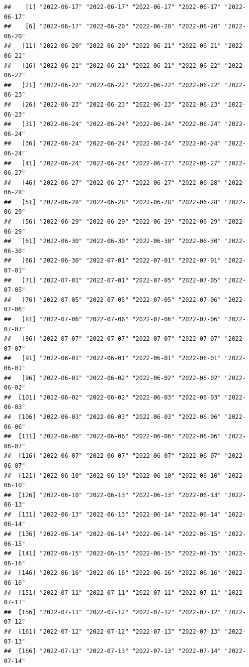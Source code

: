 \documentclass[
]{article}
\begin{document}
\begin{verbatim}
##    [1] "2022-06-17" "2022-06-17" "2022-06-17" "2022-06-17" "2022-06-17"
##    [6] "2022-06-17" "2022-06-20" "2022-06-20" "2022-06-20" "2022-06-20"
##   [11] "2022-06-20" "2022-06-20" "2022-06-21" "2022-06-21" "2022-06-21"
##   [16] "2022-06-21" "2022-06-21" "2022-06-21" "2022-06-22" "2022-06-22"
##   [21] "2022-06-22" "2022-06-22" "2022-06-22" "2022-06-22" "2022-06-23"
##   [26] "2022-06-23" "2022-06-23" "2022-06-23" "2022-06-23" "2022-06-23"
##   [31] "2022-06-24" "2022-06-24" "2022-06-24" "2022-06-24" "2022-06-24"
##   [36] "2022-06-24" "2022-06-24" "2022-06-24" "2022-06-24" "2022-06-24"
##   [41] "2022-06-24" "2022-06-24" "2022-06-27" "2022-06-27" "2022-06-27"
##   [46] "2022-06-27" "2022-06-27" "2022-06-27" "2022-06-28" "2022-06-28"
##   [51] "2022-06-28" "2022-06-28" "2022-06-28" "2022-06-28" "2022-06-29"
##   [56] "2022-06-29" "2022-06-29" "2022-06-29" "2022-06-29" "2022-06-29"
##   [61] "2022-06-30" "2022-06-30" "2022-06-30" "2022-06-30" "2022-06-30"
##   [66] "2022-06-30" "2022-07-01" "2022-07-01" "2022-07-01" "2022-07-01"
##   [71] "2022-07-01" "2022-07-01" "2022-07-05" "2022-07-05" "2022-07-05"
##   [76] "2022-07-05" "2022-07-05" "2022-07-05" "2022-07-06" "2022-07-06"
##   [81] "2022-07-06" "2022-07-06" "2022-07-06" "2022-07-06" "2022-07-07"
##   [86] "2022-07-07" "2022-07-07" "2022-07-07" "2022-07-07" "2022-07-07"
##   [91] "2022-06-01" "2022-06-01" "2022-06-01" "2022-06-01" "2022-06-01"
##   [96] "2022-06-01" "2022-06-02" "2022-06-02" "2022-06-02" "2022-06-02"
##  [101] "2022-06-02" "2022-06-02" "2022-06-03" "2022-06-03" "2022-06-03"
##  [106] "2022-06-03" "2022-06-03" "2022-06-03" "2022-06-06" "2022-06-06"
##  [111] "2022-06-06" "2022-06-06" "2022-06-06" "2022-06-06" "2022-06-07"
##  [116] "2022-06-07" "2022-06-07" "2022-06-07" "2022-06-07" "2022-06-07"
##  [121] "2022-06-10" "2022-06-10" "2022-06-10" "2022-06-10" "2022-06-10"
##  [126] "2022-06-10" "2022-06-13" "2022-06-13" "2022-06-13" "2022-06-13"
##  [131] "2022-06-13" "2022-06-13" "2022-06-14" "2022-06-14" "2022-06-14"
##  [136] "2022-06-14" "2022-06-14" "2022-06-14" "2022-06-15" "2022-06-15"
##  [141] "2022-06-15" "2022-06-15" "2022-06-15" "2022-06-15" "2022-06-16"
##  [146] "2022-06-16" "2022-06-16" "2022-06-16" "2022-06-16" "2022-06-16"
##  [151] "2022-07-11" "2022-07-11" "2022-07-11" "2022-07-11" "2022-07-11"
##  [156] "2022-07-11" "2022-07-12" "2022-07-12" "2022-07-12" "2022-07-12"
##  [161] "2022-07-12" "2022-07-12" "2022-07-13" "2022-07-13" "2022-07-13"
##  [166] "2022-07-13" "2022-07-13" "2022-07-13" "2022-07-14" "2022-07-14"

\end{verbatim}
\end{document}
